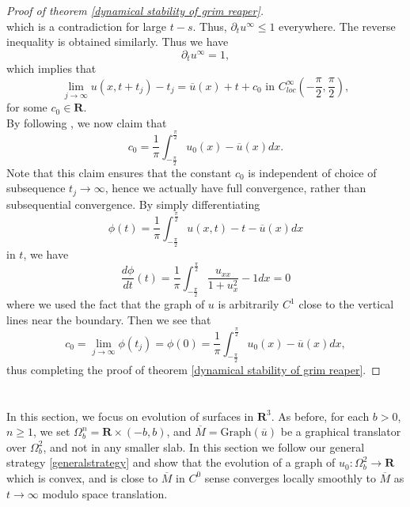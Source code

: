 \documentclass[pdflatex,sn-mathphys-num]{sn-jnl}%
\begin{document}
\begin{proof}[Proof of theorem \ref{dynamical stability of grim reaper}]
\begin{equation}
\end{equation}
which is a contradiction for large $t - s$. Thus, $\partial_tu^{\infty} \leq 1$ everywhere. The reverse inequality is obtained similarly. Thus we have
\begin{equation}
    \partial_tu^{\infty} = 1,
\end{equation}
which implies that
\begin{equation}
    \lim_{j \to \infty}u(x, t+ t_j) -t_j = \overline{u}(x) + t + c_0 \text{ in }C^{\infty}_{loc}(-\frac{\pi}{2}, \frac{\pi}{2}),
\end{equation}
for some $c_0 \in \mathbf{R}$. \\

By following \cite{WANG_WO_2011}, we now claim that
\begin{equation}
    c_0 = \frac{1}{\pi}\int_{-\frac{\pi}{2}}^{\frac{\pi}{2}}u_0(x) - \overline{u}(x)dx.
\end{equation}
Note that this claim ensures that the constant $c_0$ is independent of choice of subsequence $t_j \to \infty$, hence we actually have full convergence, rather than subsequential convergence. By simply differentiating 
\begin{equation}
    \phi(t) = \frac{1}{\pi}\int_{-\frac{\pi}{2}}^{\frac{\pi}{2}}u(x,t) - t - \overline{u}(x)dx
\end{equation}
in $t$, we have
\begin{equation}
    \frac{d\phi}{dt}(t) = \frac{1}{\pi}\int_{-\frac{\pi}{2}}^{\frac{\pi}{2}}\frac{u_{xx}}{1 + u_x^2} - 1dx = 0
\end{equation}
where we used the fact that the graph of $u$ is arbitrarily $C^1$ close to the vertical lines near the boundary. Then we see that
\begin{equation}
    c_0 = \lim_{j \to \infty} \phi(t_j) = \phi(0) = \frac{1}{\pi}\int_{-\frac{\pi}{2}}^{\frac{\pi}{2}}u_0(x) - \overline{u}(x)dx,
\end{equation}
thus completing the proof of theorem \ref{dynamical stability of grim reaper}.
\end{proof}
\section{}\label{dynamical stability of graphical translators in R3 section}
In this section, we focus on evolution of surfaces in $\mathbf{R}^3$. As before, for each $b > 0$, $n\geq 1$, we set $\Omega^n_b = \mathbf{R} \times (-b, b)$, and $\overline{M} = \text{Graph}(\overline{u})$ be a graphical translator over $\Omega^2_b$, and not in any smaller slab. In this section we follow our general strategy \ref{generalstrategy} and show that the evolution of a graph of $u_0 : \Omega_b^2 \to \mathbf{R}$ which is convex, and is close to $\overline{M}$ in $C^0$ sense converges locally smoothly to $\overline{M}$ as $t\to \infty$ modulo space translation.\\
\end{document}
